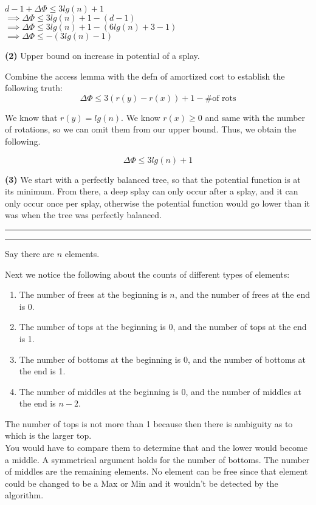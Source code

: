 \documentclass[11pt]{article}
\newcommand{\question}[2] {\vspace{.25in} \hrule\vspace{0.5em}
\noindent{\bf #1: #2} \vspace{0.5em}
\hrule \vspace{.10in}}
\renewcommand{\part}[1] {\vspace{.10in} {\bf (#1)}}
\begin{document}
$ d-1 + \Delta \Phi \leq 3 lg(n) + 1$\\
$ \implies \Delta \Phi \leq 3 lg(n) + 1 - (d - 1)$\\
$ \implies  \Delta \Phi \leq 3 lg(n) + 1 - (6 lg(n) + 3 - 1)$\\
$ \implies  \Delta \Phi \leq - (3 lg(n) - 1)$

\part{2} Upper bound on increase in potential of a splay.

Combine the access lemma with the defn of amortized cost to establish the following truth:
$$ \Delta \Phi \leq 3 (r(y) - r(x)) + 1 - \text{\# of rots}$$

We know that $r(y) = lg(n)$. We know $r(x) \geq 0$ and same with the number of rotations, so we can omit them from our upper bound.
Thus, we obtain the following.

$$ \Delta \Phi \leq 3 lg(n)  + 1$$

\part{3} 
We start with a perfectly balanced tree, so that the potential function is at its minimum.
From there, a deep splay can only occur after a splay, and it can only occur once per splay, otherwise the potential function would go lower than it was when the tree was perfectly balanced.




\question{2}{You Be the Adversary}

Say there are $n$ elements.

Next we notice the following about the counts of different types of elements:

\begin{enumerate}
\item The number of frees at the beginning is $n$, and the number of frees at the end is 0.
\item The number of tops at the beginning is $0$, and the number of tops at the end is 1.
\item The number of bottoms at the beginning is $0$, and the number of bottoms at the end is 1.
\item The number of middles at the beginning is $0$, and the number of middles at the end is $n-2$.
\end{enumerate}

The number of tops is not more than 1 because then there is ambiguity as to which is the larger top.\\
You would have to compare them to determine that and the lower would become a middle. A symmetrical argument
holds for the number of bottoms. The number of middles are the remaining elements. No element can be free
since that element could be changed to be a Max or Min and it wouldn't be detected by the algorithm.
\end{document}
